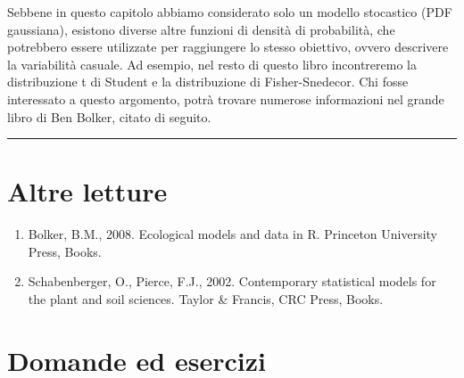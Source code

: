 \documentclass[
  12pt,
]{book}
\providecommand{\tightlist}{%
  \setlength{\itemsep}{0pt}\setlength{\parskip}{0pt}}
\begin{document}
Sebbene in questo capitolo abbiamo considerato solo un modello stocastico (PDF gaussiana), esistono diverse altre funzioni di densità di probabilità, che potrebbero essere utilizzate per raggiungere lo stesso obiettivo, ovvero descrivere la variabilità casuale. Ad esempio, nel resto di questo libro incontreremo la distribuzione t di Student e la distribuzione di Fisher-Snedecor. Chi fosse interessato a questo argomento, potrà trovare numerose informazioni nel grande libro di Ben Bolker, citato di seguito.

\begin{center}\rule{0.5\linewidth}{0.5pt}\end{center}

\hypertarget{altre-letture-4}{%
\section{Altre letture}\label{altre-letture-4}}

\begin{enumerate}
\def\labelenumi{\arabic{enumi}.}
\tightlist
\item
  Bolker, B.M., 2008. Ecological models and data in R. Princeton University Press, Books.
\item
  Schabenberger, O., Pierce, F.J., 2002. Contemporary statistical models for the plant and soil sciences. Taylor \& Francis, CRC Press, Books.
\end{enumerate}

\hypertarget{domande-ed-esercizi-3}{%
\section{Domande ed esercizi}\label{domande-ed-esercizi-3}}
\end{document}
